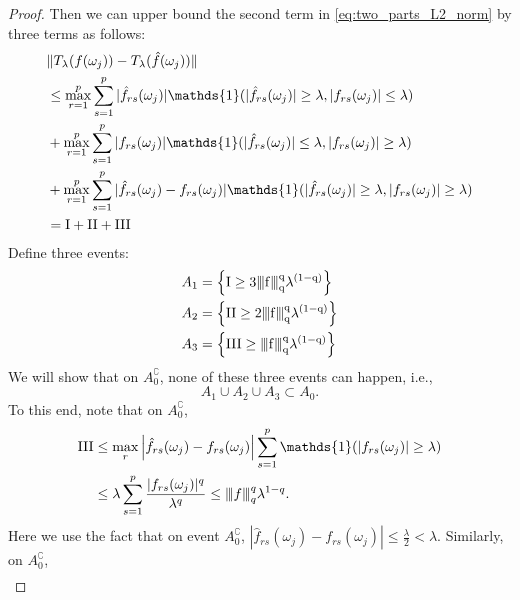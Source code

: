 \begin{proof}
Then we can upper bound the second term in \eqref{eq:two_parts_L2_norm} by three terms as follows:
\begin{equation*}
\begin{aligned}
&\|T_\lambda(f(\omega_j))-T_\lambda(\hat{f}(\omega_j))\| \\
&\le \max_{r=1}^p \sum_{s=1}^p |\hat{f}_{rs}(\omega_j)|\mathds{1}(|\hat{f}_{rs}(\omega_j)|\ge \lambda, |f_{rs}(\omega_j)|\le \lambda)\\
&+\max_{r=1}^p \sum_{s=1}^p |f_{rs}(\omega_j)|\mathds{1}(|\hat{f}_{rs}(\omega_j)|\le \lambda, |f_{rs}(\omega_j)|\ge \lambda)\\
&+\max_{r=1}^p \sum_{s=1}^p |\hat{f}_{rs}(\omega_j)-f_{rs}(\omega_j)|\mathds{1}(|\hat{f}_{rs}(\omega_j)|\ge \lambda, |f_{rs}(\omega_j)|\ge \lambda)\\
& = \rm{I}+\rm{II}+\rm{III}
\end{aligned}
\end{equation*}
Define three events:
\begin{equation*}
\begin{aligned}
&A_1 = \left\{\rm{I} \ge 3{\left\vert\kern-0.25ex\left\vert\kern-0.25ex\left\vert f \right\vert\kern-0.25ex\right\vert\kern-0.25ex\right\vert}_q^q \lambda^{(1-q)}\right\}\\
&A_2 = \left\{\rm{II}\ge 2{\left\vert\kern-0.25ex\left\vert\kern-0.25ex\left\vert f \right\vert\kern-0.25ex\right\vert\kern-0.25ex\right\vert}_q^q \lambda^{(1-q)}\right\}\\
&A_3 = \left\{\rm{III}\ge {\left\vert\kern-0.25ex\left\vert\kern-0.25ex\left\vert f \right\vert\kern-0.25ex\right\vert\kern-0.25ex\right\vert}_q^q \lambda^{(1-q)}\right\}
\end{aligned}
\end{equation*}
We will show that on $A_0^\complement$, none of these three events can happen, i.e., \begin{equation}
A_1\cup A_2 \cup A_3 \subset A_0. \nonumber
\end{equation}
To this end, note that on $A_0^\complement$, 
\begin{equation}
\label{eq:bound_III}
\begin{aligned}
\rm{III} &\le \max_r \left|\hat{f}_{rs}(\omega_j)-f_{rs}(\omega_j)\right|\sum_{s=1}^p\mathds{1}(|f_{rs}(\omega_j)|\ge \lambda)\\
& \le \lambda \sum_{s=1}^p \frac{|f_{rs}(\omega_j)|^q}{\lambda^q} \le \vertiii{f}_q^q \lambda^{1-q}. \nonumber 
\end{aligned}
\end{equation}
Here we use the fact that on event $A_0^\complement$, 
$|\hat{f}_{rs}(\omega_j) - f_{rs}(\omega_j)|\le \frac{\lambda}{2}<\lambda$. Similarly, on $A_0^\complement$,
\begin{equation*}
\begin{aligned}

\end{aligned}
\end{equation*}
\end{proof}
